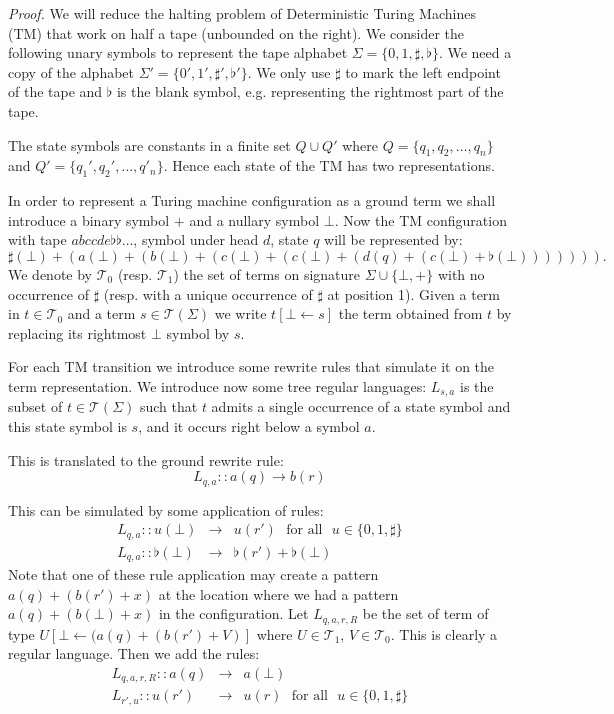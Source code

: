 \documentclass[a4paper]{article}
\theoremstyle{plain}
\newenvironment{proof}{\noindent\emph{Proof.}}{}
\newcommand{\T}{\mathcal{T}}
\begin{document}
\medskip
\begin{proof}
We will reduce the halting problem of Deterministic Turing Machines (TM) 
that work on half a tape (unbounded on the right). 
We consider the following unary symbols to represent the tape  alphabet 
$\Sigma =\{0,1,\sharp,\flat\}$. 
We need a copy of the alphabet  $\Sigma' = \{0',1',\sharp',\flat'\}$.
We  only use  $\sharp$ to mark  the left endpoint  of the tape  
and $\flat$  is the  blank symbol,  e.g. representing the rightmost part of the tape.

The state symbols  are  constants in a finite set $ Q \cup Q'$ where $Q =\{q_1, q_2, \ldots , q_n\}$ 
and  $Q' =\{q_1', q_2', \ldots  , q'_n\}$. Hence each state of the TM has two representations. 

In order to represent a Turing machine configuration as a ground term we shall 
introduce  a binary symbol $+$ and a nullary symbol $\bot$. 
Now the TM configuration with tape $abccde\flat\flat \ldots$,  symbol under head $d$, state $q$  will be represented by:
$$\sharp(\bot) + (a(\bot) + (b(\bot)+ (c(\bot) + (c(\bot)+ (d(q)+ (c(\bot) + \flat(\bot))))))).$$
We denote by $\T_0$ (resp. $\T_1$) the set of terms on signature $\Sigma \cup \{ \bot, +\}$ 
with no occurrence of $\sharp$ (resp. with a unique occurrence of $\sharp$ at position 1).
Given a term in $t\in \T_0$ and a term $s\in \T(\Sigma)$ we write $t[\bot \leftarrow s]$  the term 
obtained from $t$ by replacing its 
rightmost  $\bot$ symbol by $s$. 

For each TM transition we introduce some rewrite rules that simulate it on the term representation. 
We introduce now some tree regular languages: 
$L_{s,a}$ is the subset of $t \in \T(\Sigma)$ such that $t$ admits a single occurrence of 
a state symbol and this state symbol is $s$, and it occurs right below a symbol  $a$.


This is translated to the ground rewrite rule:
$$ L_{q,a}  :: a(q) \rightarrow b(r)$$ 

This can be simulated by some  application of rules:
\begin{eqnarray}
L_{q,a}  :: u(\bot)     &\rightarrow& u(r')  \mbox{ ~for all ~}  u \in \{0,1,\sharp\} \\
L_{q,a}  :: \flat(\bot) &\rightarrow &\flat(r') + \flat(\bot) \end{eqnarray}
Note that one of these rule application may create a pattern $a(q) + (b(r')+ x)$  at the location where we had a pattern 
$a(q) + (b(\bot)+ x)$ in the configuration. 
Let $L_{q,a,r,R}$ be the set of term of type 
$U[\bot \leftarrow (a(q) + (b(r')+ V)]$ where $U \in \T_1$, $V \in \T_0$.
This is clearly a regular language. Then we add the rules: 
\begin{eqnarray}
 L_{q,a,r,R} :: a(q) &\rightarrow &a(\bot) \\ 
 L_{r',u} :: u(r')   &\rightarrow & u(r) \mbox{ ~for all ~}  u \in \{0,1,\sharp\} 
\end{eqnarray}


\end{proof}
\end{document}
